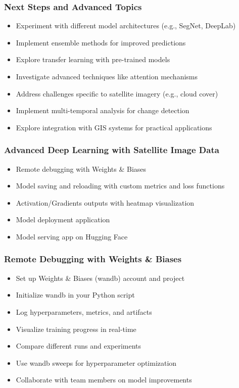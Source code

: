 \begin{frame}[fragile]\frametitle{Next Steps and Advanced Topics}
\begin{itemize}
\item Experiment with different model architectures (e.g., SegNet, DeepLab)
\item Implement ensemble methods for improved predictions
\item Explore transfer learning with pre-trained models
\item Investigate advanced techniques like attention mechanisms
\item Address challenges specific to satellite imagery (e.g., cloud cover)
\item Implement multi-temporal analysis for change detection
\item Explore integration with GIS systems for practical applications
\end{itemize}
\end{frame}

\begin{frame}[fragile]\frametitle{Advanced Deep Learning with Satellite Image Data}
\begin{itemize}
\item Remote debugging with Weights \& Biases
\item Model saving and reloading with custom metrics and loss functions
\item Activation/Gradients outputs with heatmap visualization
\item Model deployment application
\item Model serving app on Hugging Face
\end{itemize}
\end{frame}

\begin{frame}[fragile]\frametitle{Remote Debugging with Weights \& Biases}
\begin{itemize}
\item Set up Weights \& Biases (wandb) account and project
\item Initialize wandb in your Python script
\item Log hyperparameters, metrics, and artifacts
\item Visualize training progress in real-time
\item Compare different runs and experiments
\item Use wandb sweeps for hyperparameter optimization
\item Collaborate with team members on model improvements
\end{itemize}
\end{frame}

